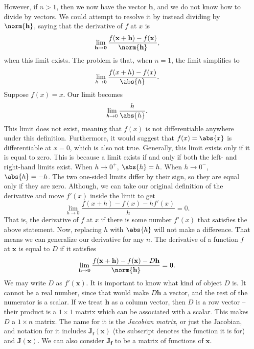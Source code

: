 \documentclass[a4paper,12pt]{article}
\begin{document}
\begin{appendices}
However, if $n > 1$, then we now have the vector $\mathbf{h}$, and we do not know how to divide by vectors.
We could attempt to resolve it by instead dividing by $\norm{\mathbf{h}}$, saying that the derivative of $f$ at $x$ is
\begin{equation*}
    \lim_{\mathbf{h} \to \mathbf{0}} \frac{f(\mathbf{x}+\mathbf{h}) - f(\mathbf{x})}{\norm{\mathbf{h}}},
\end{equation*}
when this limit exists.
The problem is that, when $n=1$, the limit simplifies to
\begin{equation*}
    \lim_{h \to 0} \frac{f(x+h) - f(x)}{\abs{h}}.
\end{equation*}
Suppose $f(x) = x$.
Our limit becomes
\begin{equation*}
    \lim_{h \to 0} \frac{h}{\abs{h}}.
\end{equation*}
This limit does not exist, meaning that $f(x)$ is not differentiable anywhere under this definition.
Furthermore, it would suggest that $f(x) = \abs{x}$ is differentiable at $x=0$, which is also not true.
Generally, this limit exists only if it is equal to zero.
This is because a limit exists if and only if both the left- and right-hand limits exist.
When $h \to 0^+$, $\abs{h} = h$.
When $h \to 0^-$, $\abs{h} = -h$.
The two one-sided limits differ by their sign, so they are equal only if they are zero.
Although, we can take our original definition of the derivative and move $f'(x)$ inside the limit to get
\begin{equation*}
    \lim_{h \to 0} \frac{f(x+h) - f(x) - hf'(x)}{h} = 0.
\end{equation*}
That is, the derivative of $f$ at $x$ if there is some number $f'(x)$ that satisfies the above statement.
Now, replacing $h$ with $\abs{h}$ will not make a difference.
That means we can generalize our derivative for any $n$.
The derivative of a function $f$ at $\mathbf{x}$ is equal to $D$ if it satisfies
\begin{equation*}
    \lim_{\mathbf{h} \to \mathbf{0}} \frac{f(\mathbf{x}+\mathbf{h}) - f(\mathbf{x}) - D\mathbf{h}}{\norm{\mathbf{h}}} = \mathbf{0}.
\end{equation*}
We may write $D$ as $f'(\mathbf{x})$.
It is important to know what kind of object $D$ is.
It cannot be a real number, since that would make $D\mathbf{h}$ a vector, and the rest of the numerator is a scalar.
If we treat $\mathbf{h}$ as a column vector, then $D$ is a row vector -- their product is a $1 \times 1$ matrix which can be associated with a scalar.
This makes $D$ a $1 \times n$ matrix.
The name for it is the \emph{Jacobian matrix}, or just the Jacobian, and notation for it includes $\mathbf{J_f}(\mathbf{x})$ (the subscript denotes the function it is for) and $\mathbf{J}(\mathbf{x})$.
We can also consider $\mathbf{J_f}$ to be a matrix of functions of $\mathbf{x}$.


\end{appendices}
\end{document}
